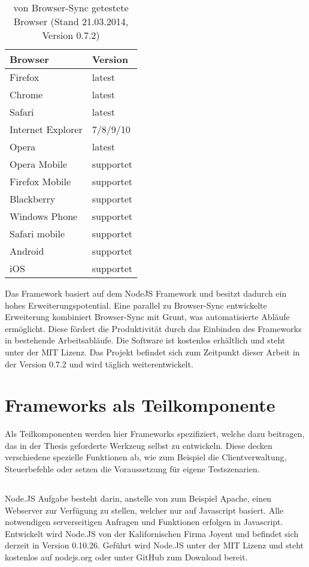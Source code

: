 		\begin{table}[H]
 		\centering
			\begin{tabular}{| p{5cm} | p{5cm} |}
			
			\hline
				Browser 	& 	Version\\
			\hline
			\hline
				Firefox	&	latest\\
				Chrome	&	latest\\
				Safari	&	latest\\
				Internet Explorer	&	7/8/9/10\\
				Opera	&	latest\\
				Opera Mobile	&	supportet\\
				Firefox Mobile	&	supportet\\
				Blackberry	&	supportet\\
				Windows Phone	&	supportet\\
				Safari mobile	&	supportet\\	
				Android	&	supportet\\
				iOS		&	supportet\\
				\hline
				\end{tabular}
			\caption{von Browser-Sync getestete Browser (Stand 21.03.2014, Version 0.7.2)}
	\end{table}
	
	Das Framework basiert auf dem NodeJS Framework und besitzt dadurch ein hohes Erweiterungspotential. Eine parallel zu Browser-Sync entwickelte Erweiterung kombiniert Browser-Sync mit Grunt, was automatisierte Abläufe ermöglicht. Diese fördert die Produktivität durch das Einbinden des Frameworks in bestehende Arbeitsabläufe. Die Software ist kostenlos erhältlich und steht unter der MIT Lizenz. Das Projekt befindet sich zum Zeitpunkt dieser Arbeit in der Version 0.7.2 und wird täglich weiterentwickelt.

\pagebreak
\section{Frameworks als Teilkomponente}
	Als Teilkomponenten werden hier Frameworks spezifiziert, welche dazu beitragen, das in der Thesis geforderte Werkzeug selbst zu entwickeln. Diese decken verschiedene spezielle Funktionen ab, wie zum Beispiel die Clientverwaltung, Steuerbefehle oder setzen die Voraussetzung für eigene Testszenarien.
	
	\subsection{}
	Node.JS Aufgabe besteht darin, anstelle von zum Beispiel Apache, einen Webserver zur Verfügung zu stellen, welcher nur auf Javascript basiert. Alle notwendigen serverseitigen Anfragen und Funktionen erfolgen in Javascript. Entwickelt wird Node.JS von der Kalifornischen Firma Joyent und befindet sich derzeit in Version 0.10.26. Geführt wird Node.JS unter der MIT Lizenz und steht kostenlos auf nodejs.org oder unter GitHub zum Download bereit.
	

